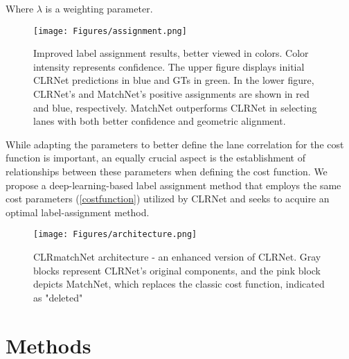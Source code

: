 \documentclass[10pt,twocolumn,letterpaper]{article}
\begin{document}
Where $\lambda$ is a weighting parameter.


\begin{figure}[t]
\begin{center}
   \texttt{[image: Figures/assignment.png]}
\caption{Improved label assignment results, better viewed in colors. Color intensity represents confidence. The upper figure displays initial CLRNet predictions in blue and GTs in green. In the lower figure, CLRNet's and MatchNet's positive assignments are shown in red and blue, respectively. MatchNet outperforms CLRNet in selecting lanes with both better confidence and geometric alignment.}
\end{center}
\label{assignment}
\end{figure}

While adapting the parameters to better define the lane correlation for the cost function is important, an equally crucial aspect is the establishment of relationships between these parameters when defining the cost function. We propose a deep-learning-based label assignment method that employs the same cost parameters (\ref{costfunction}) utilized by CLRNet and seeks to acquire an optimal label-assignment method.

\begin{figure*}
\begin{center}
    \texttt{[image: Figures/architecture.png]}
\caption{CLRmatchNet architecture - an enhanced version of CLRNet. Gray blocks represent CLRNet's original components, and the pink block depicts MatchNet, which replaces the classic cost function, indicated as "deleted"}
\label{CLRmatchNet}
\end{center}
\end{figure*}

\section{Methods} 
\end{document}
